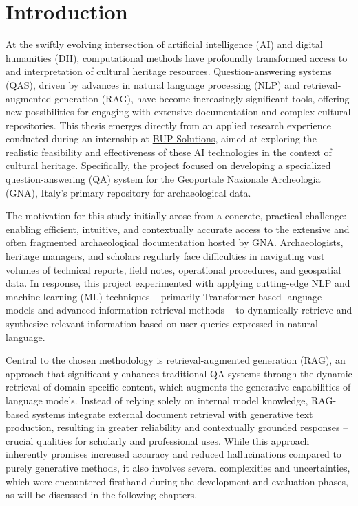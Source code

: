 \chapter{Introduction}
\label{chap:introduction}
\begin{spacing}{1.5}  %
At the swiftly evolving intersection of artificial intelligence (AI) and digital humanities (DH), computational methods have profoundly transformed access to and interpretation of cultural heritage resources. Question-answering systems (QAS), driven by advances in natural language processing (NLP) and retrieval-augmented generation (RAG), have become increasingly significant tools, offering new possibilities for engaging with extensive documentation and complex cultural repositories. This thesis emerges directly from an applied research experience conducted during an internship at \href{https://www.bupsolutions.com/en/home_en/}{BUP Solutions}\nocite{bup_solutions_bup_nodate}, aimed at exploring the realistic feasibility and effectiveness of these AI technologies in the context of cultural heritage. Specifically, the project focused on developing a specialized question-answering (QA) system for the Geoportale Nazionale Archeologia (GNA), Italy’s primary repository for archaeological data.

The motivation for this study initially arose from a concrete, practical challenge: enabling efficient, intuitive, and contextually accurate access to the extensive and often fragmented archaeological documentation hosted by GNA. Archaeologists, heritage managers, and scholars regularly face difficulties in navigating vast volumes of technical reports, field notes, operational procedures, and geospatial data. In response, this project experimented with applying cutting-edge NLP and machine learning (ML) techniques -- primarily Transformer-based language models and advanced information retrieval methods -- to dynamically retrieve and synthesize relevant information based on user queries expressed in natural language.

Central to the chosen methodology is retrieval-augmented generation (RAG), an approach that significantly enhances traditional QA systems through the dynamic retrieval of domain-specific content, which augments the generative capabilities of language models. Instead of relying solely on internal model knowledge, RAG-based systems integrate external document retrieval with generative text production, resulting in greater reliability and contextually grounded responses -- crucial qualities for scholarly and professional uses. While this approach inherently promises increased accuracy and reduced hallucinations compared to purely generative methods, it also involves several complexities and uncertainties, which were encountered firsthand during the development and evaluation phases, as will be discussed in the following chapters.


\end{spacing}
